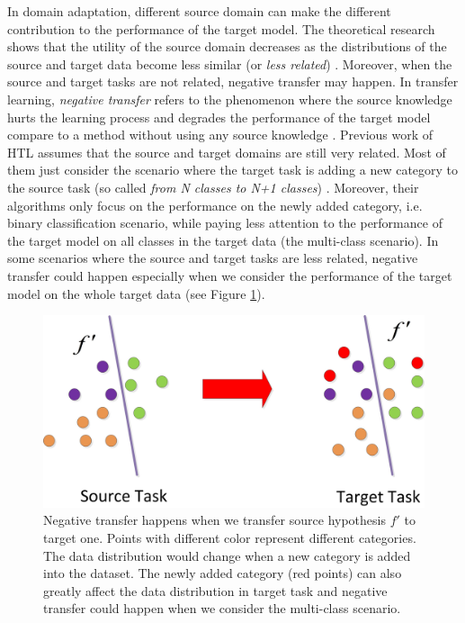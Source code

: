 In domain adaptation, different source domain can make the different contribution to the performance of the target model.
The theoretical research shows that the utility of the source domain decreases as the distributions of the source and target data become less similar (or \textit{less related})  \cite{ben2010theory} \cite{ben2007analysis}. Moreover, when the source and target tasks are not related, negative transfer may happen. In transfer learning, \textit{negative transfer} 
refers to the phenomenon where the source knowledge hurts the learning process and degrades the performance of the target model compare to a method without using any source knowledge \cite{pan2010survey}. 
Previous work of HTL assumes that the source and target domains are still very related. Most of them just consider the scenario where the target task is adding a new category to the source task (so called \textit{from N classes to N+1 classes}) \cite{tommasi2014learning} \cite{kuzborskij2013n} \cite{jie2011multiclass}. Moreover, their algorithms only focus on the performance on the newly added category, i.e. binary classification scenario, while paying less attention to the performance of the target model on all classes in the target data (the multi-class scenario). In some scenarios where the source and target tasks are less related, negative transfer could happen especially when we consider the performance of the target model on the whole target data (see Figure \ref{fig:distribution}).


\begin{figure}
\centering
\includegraphics[scale=.5]{fig/domain.jpg}
\caption{Negative transfer happens when we transfer source hypothesis $f'$ to target one. Points with different color represent different categories. The data distribution would change when a new category is added into the dataset. The newly added category (red points) can also greatly affect the data distribution in target task and negative transfer could happen when we consider the multi-class scenario. }\label{fig:distribution}
\end{figure}

